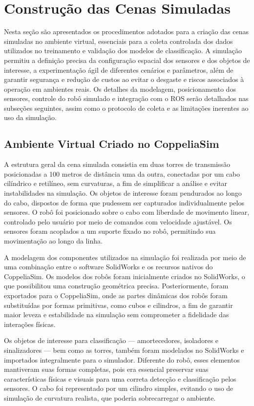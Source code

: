 \section{Construção das Cenas Simuladas}

Nesta seção são apresentados os procedimentos adotados para a criação das cenas simuladas no ambiente virtual, essenciais para a coleta controlada dos dados utilizados no treinamento e validação dos modelos de classificação. A simulação permitiu a definição precisa da configuração espacial dos sensores e dos objetos de interesse, a experimentação ágil de diferentes cenários e parâmetros, além de garantir segurança e redução de custos ao evitar o desgaste e riscos associados à operação em ambientes reais. Os detalhes da modelagem, posicionamento dos sensores, controle do robô simulado e integração com o ROS serão detalhados nas subseções seguintes, assim como o protocolo de coleta e as limitações inerentes ao uso da simulação.

\subsection{Ambiente Virtual Criado no CoppeliaSim}

A estrutura geral da cena simulada consistia em duas torres de transmissão posicionadas a 100 metros de distância uma da outra, conectadas por um cabo cilíndrico e retilíneo, sem curvaturas, a fim de simplificar a análise e evitar instabilidades na simulação. Os objetos de interesse foram pendurados ao longo do cabo, dispostos de forma que pudessem ser capturados individualmente pelos sensores. O robô foi posicionado sobre o cabo com liberdade de movimento linear, controlado pelo usuário por meio de comandos com velocidade ajustável. Os sensores foram acoplados a um suporte fixado no robô, permitindo sua movimentação ao longo da linha.

A modelagem dos componentes utilizados na simulação foi realizada por meio de uma combinação entre o software SolidWorks e os recursos nativos do CoppeliaSim. Os modelos dos robôs foram inicialmente criados no SolidWorks, o que possibilitou uma construção geométrica precisa. Posteriormente, foram exportados para o CoppeliaSim, onde as partes dinâmicas dos robôs foram substituídas por formas primitivas, como cubos e cilindros, a fim de garantir maior leveza e estabilidade na simulação sem comprometer a fidelidade das interações físicas.

Os objetos de interesse para classificação — amortecedores, isoladores e sinalizadores — bem como as torres, também foram modelados no SolidWorks e importados integralmente para o simulador. Diferente do robô, esses elementos mantiveram suas formas completas, pois era essencial preservar suas características físicas e visuais para uma correta detecção e classificação pelos sensores. O cabo foi representado por um cilindro simples, evitando o uso de simulação de curvatura realista, que poderia sobrecarregar o ambiente.

